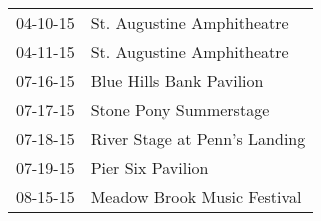 \begin{supertabular}{p{0.25\columnwidth}p{0.75\columnwidth}}
 04-10-15 &     St. Augustine Amphitheatre \\
 04-11-15 &     St. Augustine Amphitheatre \\
 07-16-15 &       Blue Hills Bank Pavilion \\
 07-17-15 &         Stone Pony Summerstage \\
 07-18-15 &  River Stage at Penn's Landing \\
 07-19-15 &              Pier Six Pavilion \\
 08-15-15 &    Meadow Brook Music Festival \\
\end{supertabular}
